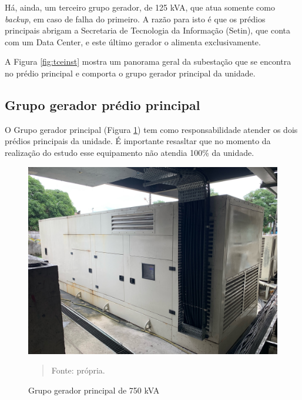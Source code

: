 Há, ainda, um terceiro grupo gerador, de 125 kVA, que atua somente como \textit{backup}, em caso de falha do primeiro. A razão para isto é que os prédios principais abrigam a Secretaria de Tecnologia da Informação (Setin), que conta com um Data Center, e este último gerador o alimenta exclusivamente.

A Figura \ref{fig:tceinst} mostra um panorama geral da subestação que se encontra no prédio principal e comporta o grupo gerador principal da unidade.

\subsection{Grupo gerador prédio principal}
\hspace*{0.8cm} O Grupo gerador principal (Figura \ref{fig:gerador750}) tem como responsabilidade atender os dois prédios principais da unidade. É importante resasltar que no momento da realização do estudo esse equipamento não atendia 100\% da unidade.

\begin{figure}[H]
\begin{center}
			\caption{Grupo gerador principal de 750 kVA}
			\includegraphics[width=.9\textwidth]{Figuras/gerador_750.jpeg}
            \vspace*{\fill} 
            \begin{quote} 
            \centering 
            Fonte: própria.
            \end{quote}
            \vspace*{\fill}
			\label{fig:gerador750}
\end{center}
\end{figure}

